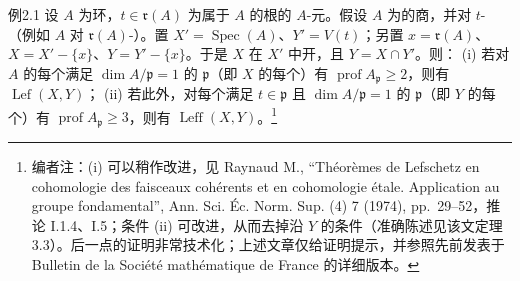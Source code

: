 \begin{SGAresult}{例}{2.1}
设 $A$ 为环，$t\in\mathfrak r(A)$ 为属于 $A$ 的根的 $A$-元。假设 $A$ 为的商，并对 $t$-（例如 $A$ 对 $\mathfrak r(A)$-）。置 $X'=\operatorname{Spec}(A)$、$Y'=V(t)$；另置 $x=\mathfrak r(A)$、$X=X'-\{x\}$、$Y=Y'-\{x\}$。于是 $X$ 在 $X'$ 中开，且 $Y=X\cap Y'$。则：
(i) 若对 $A$ 的每个满足 $\dim A/\mathfrak p=1$ 的 $\mathfrak p$（即 $X$ 的每个）有 $\operatorname{prof}A_{\mathfrak p}\geq2$，则有 $\operatorname{Lef}(X,Y)$；
(ii) 若此外，对每个满足 $t\in\mathfrak p$ 且 $\dim A/\mathfrak p=1$ 的 $\mathfrak p$（即 $Y$ 的每个）有 $\operatorname{prof}A_{\mathfrak p}\geq3$，则有 $\operatorname{Leff}(X,Y)$。\footnote{编者注：(i) 可以稍作改进，见 Raynaud M., ``Théorèmes de Lefschetz en cohomologie des faisceaux cohérents et en cohomologie étale. Application au groupe fondamental'', Ann. Sci. Éc. Norm. Sup. (4) 7 (1974), pp.~29--52，推论 I.1.4、I.5；条件 (ii) 可改进，从而去掉沿 $Y$ 的条件（准确陈述见该文定理 3.3）。后一点的证明非常技术化；上述文章仅给证明提示，并参照先前发表于 Bulletin de la Société mathématique de France 的详细版本。}
\end{SGAresult}
